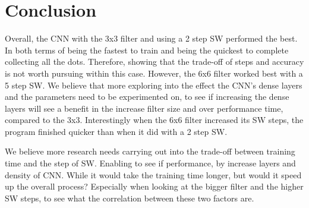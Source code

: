 \documentclass[a4paper,10pt]{article}
\begin{document}
\section{Conclusion}

Overall, the CNN with the 3x3 filter and using a 2 step SW performed the best. In both terms of being the fastest to train and being the quickest to complete collecting all the dots. Therefore, showing that the trade-off of steps and accuracy is not worth pursuing within this case. However, the 6x6 filter worked best with a 5 step SW. We believe that more exploring into the effect the CNN's dense layers and the parameters need to be experimented on, to see if increasing the dense layers will see a benefit in the increase filter size and over performance time, compared to the 3x3. Interestingly when the 6x6 filter increased its SW steps, the program finished quicker than when it did with a 2 step SW. 

We believe more research needs carrying out into the trade-off between training time and the step of SW. Enabling to see if performance, by increase layers and density of CNN. While it would take the training time longer, but would it speed up the overall process? Especially when looking at the bigger filter and the higher SW steps, to see what the correlation between these two factors are.


%	

	
	
\end{document}
